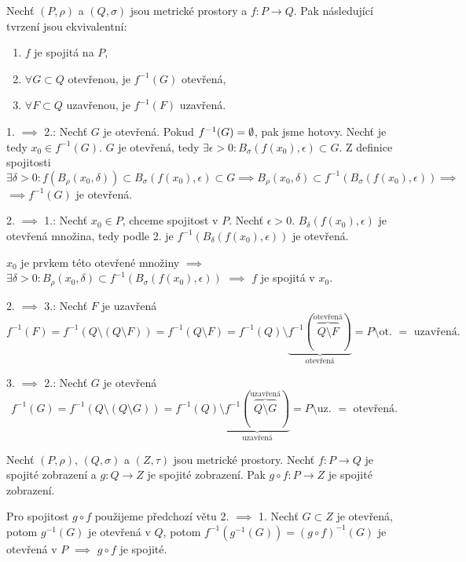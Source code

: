 \documentclass[12pt]{article}					%
\begin{document}
	\begin{veta}
		Nechť $(P, \rho)$ a $(Q, \sigma)$ jsou metrické prostory a $f: P \rightarrow Q$. Pak následující tvrzení jsou ekvivalentní:

		\begin{enumerate}
			\item $f$ je spojitá na $P$,
			\item $\forall G \subset Q$ otevřenou, je $f^{-1}(G)$ otevřená,
			\item $\forall F \subset Q$ uzavřenou, je $f^{-1}(F)$ uzavřená.
		\end{enumerate}

		\begin{dukazin}
			1. $\implies$ 2.: Nechť $G$ je otevřená. Pokud $f^{-1}(G) = \emptyset$, pak jsme hotovy. Nechť je tedy $x_0 \in f^{-1}(G)$. $G$ je otevřená, tedy $\exists \epsilon > 0: B_\sigma(f(x_0), \epsilon) \subset G$. Z definice spojitosti
			$$ \exists \delta > 0: f(B_\rho(x_0, \delta)) \subset B_\sigma(f(x_0), \epsilon) \subset G \implies B_\rho(x_0, \delta) \subset f^{-1}(B_\sigma(f(x_0), \epsilon)) \implies $$
			$\implies f^{-1}(G)$ je otevřená.

			2. $\implies$ 1.: Nechť $x_0 \in P$, chceme spojitost v $P$. Nechť $\epsilon > 0$. $B_{\delta}(f(x_0), \epsilon)$ je otevřená množina, tedy podle 2. je $f^{-1}(B_\delta(f(x_0), \epsilon))$ je otevřená.

			$x_0$ je prvkem této otevřené množiny $\implies$ $\exists \delta > 0: B_\rho(x_0, \delta) \subset f^{-1}(B_\sigma(f(x_0), \epsilon))$ $\implies$ $f$ je spojitá v $x_0$.

			2. $\implies$ 3.: Nechť $F$ je uzavřená
			$$ f^{-1}(F) = f^{-1}(Q \setminus (Q \setminus F)) = f^{-1}(Q \setminus F) = f^{-1}(Q) \setminus \underbrace{f^{-1}(\overbrace{Q \setminus F}^{\text{otevřená}})}_{\text{otevřená}} = P \setminus \text{ot. } = \text{ uzavřená}. $$

			3. $\implies$ 2.: Nechť $G$ je otevřená
			$$ f^{-1}(G) = f^{-1}(Q \setminus (Q \setminus G)) = f^{-1}(Q) \setminus \underbrace{f^{-1}(\overbrace{Q \setminus G}^{\text{uzavřená}})}_{\text{uzavřená}} = P \setminus \text{uz. } = \text{ otevřená}. $$
		\end{dukazin}
	\end{veta}

	\begin{veta}
		Nechť $(P, \rho)$, $(Q, \sigma)$ a $(Z, \tau)$ jsou metrické prostory. Nechť $f: P \rightarrow Q$ je spojité zobrazení a $g: Q \rightarrow Z$ je spojité zobrazení. Pak $g \circ f: P \rightarrow Z$ je spojité zobrazení.

		\begin{dukazin}
			Pro spojitost $g \circ f$ použijeme předchozí větu 2. $\implies$ 1. Nechť $G \subset Z$ je otevřená, potom $g^{-1}(G)$ je otevřená v $Q$, potom $f^{-1}(g^{-1}(G)) = (g \circ f)^{-1}(G)$ je otevřená v $P$ $\implies$ $g \circ f$ je spojité.
		\end{dukazin}
	\end{veta}
\end{document}
